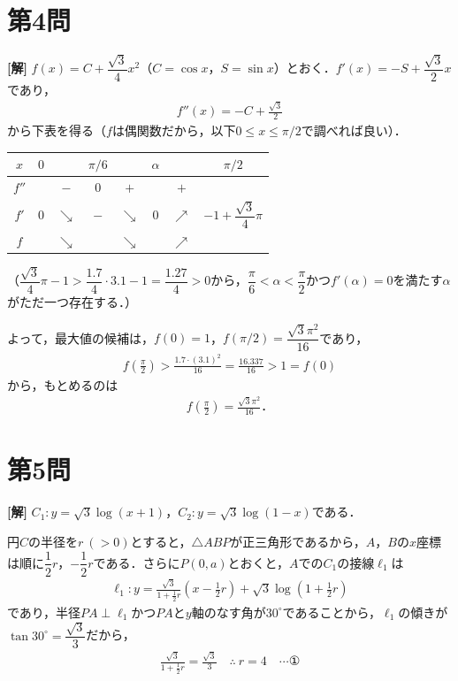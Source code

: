 \documentclass[../main.tex]{subfiles}
\begin{document}
\newpage

\section*{第4問}

{\bf [解]}
$f(x)=C+\dfrac{\sqrt3}4x^2$（$C=\cos x$，$S=\sin x$）とおく．$f'(x)=-S+\dfrac{\sqrt3}2x$であり，
\begin{align*}
  f''(x)=-C+\frac{\sqrt3}2
\end{align*}
から下表を得る（$f$は偶関数だから，以下$0\le x\le\pi/2$で調べれば良い）．

\begin{center}
  \begin{tabular}{c|ccccccc}
    $x$ & $0$ & & $\pi/6$ & & $\alpha$ & & $\pi/2$ \\
    \hline
    $f''$ & & $-$ & $0$ & $+$ & & $+$ & \\
    \hline
    $f'$ & $0$ & $\searrow$ & $-$ & $\searrow$ & $0$ & $\nearrow$ & $-1+\dfrac{\sqrt3}4\pi$ \\
    \hline
    $f$ & & $\searrow$ & & $\searrow$ & & $\nearrow$ & \\
  \end{tabular}
\end{center}

（$\dfrac{\sqrt3}4\pi-1>\dfrac{1.7}4\cdot3.1-1=\dfrac{1.27}4>0$から，$\dfrac\pi6<\alpha<\dfrac\pi2$かつ$f'(\alpha)=0$を満たす$\alpha$がただ一つ存在する．）

よって，最大値の候補は，$f(0)=1$，$f(\pi/2)=\dfrac{\sqrt3\pi^2}{16}$であり，
\begin{align*}
  f\left(\frac\pi2\right)>\frac{1.7\cdot(3.1)^2}{16}=\frac{16.337}{16}>1=f(0)
\end{align*}
から，もとめるのは
\begin{align*}
  f\left(\frac\pi2\right)=\frac{\sqrt3\pi^2}{16}．
\end{align*}

\newpage

\section*{第5問}

{\bf [解]}
$C_1:y=\sqrt3\log(x+1)$，$C_2:y=\sqrt3\log(1-x)$である．

円$C$の半径を$r\ (>0)$とすると，$\triangle ABP$が正三角形であるから，$A$，$B$の$x$座標は順に$\dfrac12r$，$-\dfrac12r$である．さらに$P(0,a)$とおくと，$A$での$C_1$の接線$\ell_1$は
\begin{align*}
  \ell_1:y=\frac{\sqrt3}{1+\frac12r}\left(x-\frac12r\right)+\sqrt3\log\left(1+\frac12r\right)
\end{align*}
であり，半径$PA\perp\ell_1$かつ$PA$と$y$軸のなす角が$30^\circ$であることから，$\ell_1$の傾きが$\tan30^\circ=\dfrac{\sqrt3}3$だから，
\begin{align*}
  \frac{\sqrt3}{1+\frac12r}=\frac{\sqrt3}{3}\quad\therefore\ r=4\quad\cdots①
\end{align*}
\end{document}
